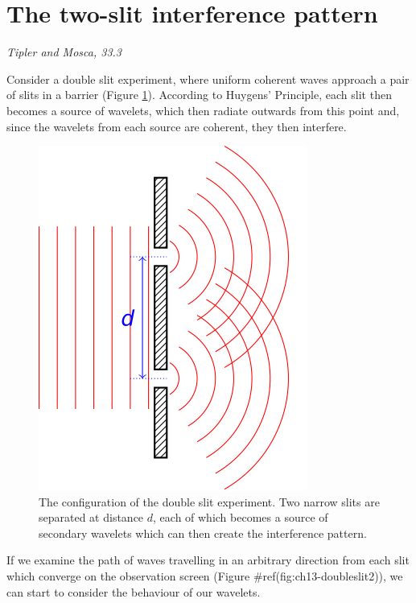 \documentclass[
]{book}
\begin{document}
\hypertarget{sec:ch13-twoslitinterference}{%
\section{The two-slit interference pattern}\label{sec:ch13-twoslitinterference}}

\emph{Tipler and Mosca, 33.3}

Consider a double slit experiment, where uniform coherent waves approach a pair of slits in a barrier (Figure \ref{fig:ch13-doubleslit1}). According to Huygens' Principle, each slit then becomes a source of wavelets, which then radiate outwards from this point and, since the wavelets from each source are coherent, they then interfere.

\begin{figure}

{\centering \includegraphics[width=0.7\linewidth]{visualisations/LaTeX/ch13-doubleslits} 

}

\caption{The configuration of the double slit experiment. Two narrow slits are separated at distance $d$, each of which becomes a source of secondary wavelets which can then create the interference pattern.}\label{fig:ch13-doubleslit1}
\end{figure}

If we examine the path of waves travelling in an arbitrary direction from each slit which converge on the observation screen (Figure \#ref(fig:ch13-doubleslit2)), we can start to consider the behaviour of our wavelets.
\end{document}
